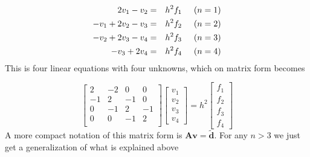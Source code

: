 \documentclass[11pt]{article}
\begin{document}
\begin{eqnarray*}
2v_1 - v_2 &=& h^2f_1  \hspace{0.5cm} (n = 1)\\
-v_1 + 2v_2 - v_3 &=&h^2f_2  \hspace{0.5cm} (n = 2)\\
-v_2 + 2v_3 - v_4 &=&h^2f_3  \hspace{0.5cm} (n = 3)\\
-v_3 + 2v_4  &=&h^2f_4  \hspace{0.5cm} (n = 4)\\
\end{eqnarray*} 
This is four linear equations with four unknowns, which on matrix form becomes

\[
\begin{bmatrix}
  2 & -2 & 0 & 0 \\
 -1 & 2 & -1 &  0 \\
  0 & -1 & 2 & -1 \\
  0 & 0 & -1 & 2\\   
\end{bmatrix}
\begin{bmatrix}
v_1\\v_2\\v_3\\v_4
\end{bmatrix}
= h^2
\begin{bmatrix}
f_1\\f_2\\f_3\\f_4
\end{bmatrix}
\]
A more compact notation of this matrix form is $\mathbf{A}\mathbf{v} = \tilde{\mathbf{d}}$. For
any $n>3$ we just get a generalization of what is explained above
\end{document}
